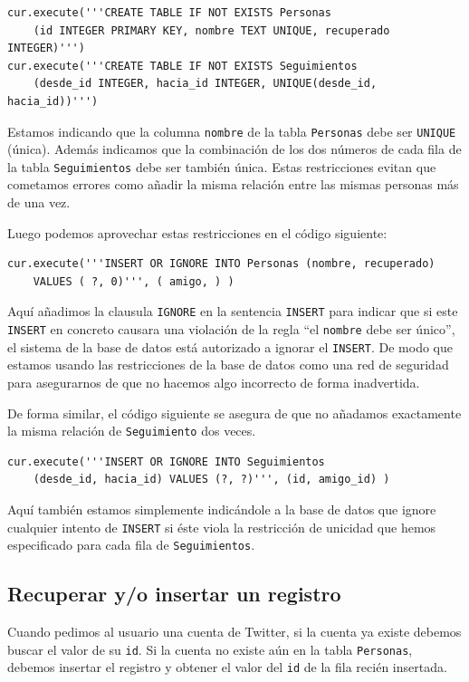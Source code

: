 \beforeverb
\begin{verbatim}
cur.execute('''CREATE TABLE IF NOT EXISTS Personas 
    (id INTEGER PRIMARY KEY, nombre TEXT UNIQUE, recuperado INTEGER)''')
cur.execute('''CREATE TABLE IF NOT EXISTS Seguimientos 
    (desde_id INTEGER, hacia_id INTEGER, UNIQUE(desde_id, hacia_id))''')
\end{verbatim}
\afterverb
%
Estamos indicando que la columna {\tt nombre} de la tabla {\tt Personas} debe ser
{\tt UNIQUE} (única). Además indicamos que la combinación de los dos números
de cada fila de la tabla {\tt Seguimientos} debe ser también única. Estas restricciones
evitan que cometamos errores como añadir la misma relación entre las mismas personas
más de una vez.

Luego podemos aprovechar estas restricciones en el código siguiente:

\beforeverb
\begin{verbatim}
cur.execute('''INSERT OR IGNORE INTO Personas (nombre, recuperado) 
    VALUES ( ?, 0)''', ( amigo, ) )
\end{verbatim}
\afterverb
%
Aquí añadimos la clausula {\tt IGNORE} en la sentencia {\tt INSERT} para indicar
que si este {\tt INSERT} en concreto causara una violación de la regla
``el {\tt nombre} debe ser único'', el sistema de la base de datos está autorizado
a ignorar el {\tt INSERT}. De modo que estamos usando las restricciones de la base de datos
como una red de seguridad para asegurarnos de que no hacemos algo incorrecto de forma inadvertida.

De forma similar, el código siguiente se asegura de que no añadamos exactamente
la misma relación de {\tt Seguimiento} dos veces.

\beforeverb
\begin{verbatim}
cur.execute('''INSERT OR IGNORE INTO Seguimientos 
    (desde_id, hacia_id) VALUES (?, ?)''', (id, amigo_id) )
\end{verbatim}
\afterverb
%
Aquí también estamos simplemente indicándole a la base de datos que ignore cualquier intento
de {\tt INSERT} si éste viola la restricción de unicidad
que hemos especificado para cada fila de {\tt Seguimientos}.

\subsection{Recuperar y/o insertar un registro}

Cuando pedimos al usuario una cuenta de Twitter, si la cuenta ya
existe debemos buscar el valor de su {\tt id}. Si la cuenta
no existe aún en la tabla {\tt Personas}, debemos insertar
el registro y obtener el valor del {\tt id} de la fila
recién insertada.

